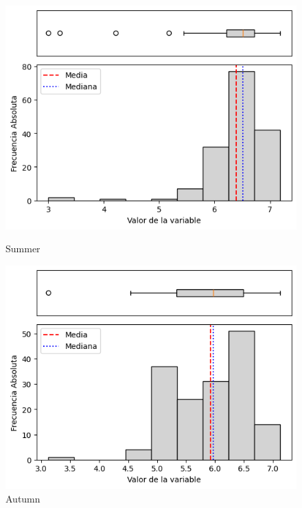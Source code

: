 \begin{figure}[htbp]
\centering
\begin{minipage}{0.30\textwidth}
  \includegraphics[width=\linewidth]{resultados/por_estacion_del_anio/boxplot_clases_por_estacion/Candavare/PET_HistBoxplot_Summer.png}
  \caption*{Summer}
\end{minipage}
\hfill
\begin{minipage}{0.30\textwidth}
  \includegraphics[width=\linewidth]{resultados/por_estacion_del_anio/boxplot_clases_por_estacion/Candavare/PET_HistBoxplot_Autumn.png}
  \caption*{Autumn}
\end{minipage}

\vspace{0.2cm}


\end{figure}

